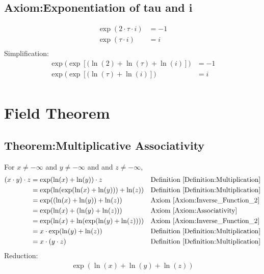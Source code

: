 \documentclass[12pt,a4paper]{report}
\begin{document}
\section{Axiom:Exponentiation of tau and i}
\label{Axiom:Exponentiation_of_tau_and_i}
\begin{align*}
\exp (2 \cdot \tau \cdot i) &= -1 \\
\exp (\tau \cdot i) &= i \\
\end{align*}
Simplification:
\begin{align*}
\exp \big(\exp[ (\ln(2) + \ln(\tau) + \ln(i) ] \big) &= -1 \\
\exp \big(\exp[ (\ln(\tau) + \ln(i) ] \big) &= i \\
\end{align*}

\chapter{Field Theorem}
\section{Theorem:Multiplicative Associativity}
\label{Theorem:Multiplicative_Associativity}
For $x \neq -\infty$ and $y \neq -\infty$ and and $z \neq -\infty$,
\begin{align*}
(x \cdot y) \cdot z
&= \exp(\ln(x) + \ln(y)) \cdot z
&& \text{Definition \ref{Definition:Multiplication}} \\
&= \exp(\ln(\exp(\ln(x) + \ln(y))) + \ln(z))
&& \text{Definition \ref{Definition:Multiplication}} \\
&= \exp((\ln(x) + \ln(y)) + \ln(z))
&& \text{Axiom \ref{Axiom:Inverse_Function_2}} \\
&= \exp(\ln(x) + (\ln(y) + \ln(z)))
&& \text{Axiom \ref{Axiom:Associativity}} \\
&= \exp(\ln(x) + \ln(\exp(\ln(y) + \ln(z))))
&& \text{Axiom \ref{Axiom:Inverse_Function_2}} \\
&= x \cdot \exp(\ln(y) + \ln(z))
&& \text{Definition \ref{Definition:Multiplication}} \\
&= x \cdot (y \cdot z)
&& \text{Definition \ref{Definition:Multiplication}} \\
\end{align*}
Reduction:
\begin{align*}
\exp(\ln(x) + \ln(y) + \ln(z))
\end{align*}
\end{document}
